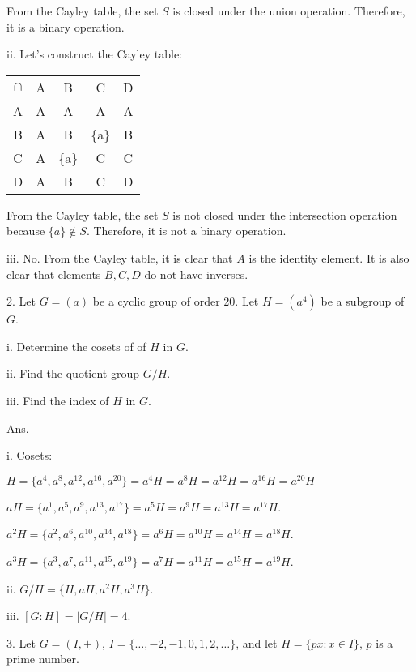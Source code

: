 \documentclass{article}
\begin{document}
From the Cayley table, the set $S$ is closed under the union operation. Therefore, it is a binary operation.
\newline

ii. Let's construct the Cayley table:

\begin{center}
  \begin{tabular}{c | c c c c}
    $\cap$ & A & B & C & D \\
    \cline{1-5}
    A & A & A & A & A \\
    B & A & B & \{a\} & B \\
    C & A & \{a\} & C & C \\
    D & A & B & C & D \\
  \end{tabular}
\end{center}

From the Cayley table, the set $S$ is not closed under the intersection operation because $\{a\} \notin S$. Therefore, it is not a binary operation.
\newline

iii. No. From the Cayley table, it is clear that $A$ is the identity element. It is also clear that elements $B, C, D$ do not have inverses.

\newpage

2. Let $G=(a)$ be a cyclic group of order 20. Let $H=(a^4)$ be a subgroup of $G$.

\qquad i. Determine the cosets of of $H$ in $G$.

\qquad ii. Find the quotient group $G/H$.

\qquad iii. Find the index of $H$ in $G$.

\noindent
\underline{Ans.}

i. 
Cosets:

$H = \{ a^4, a^8, a^{12}, a^{16}, a^{20} \} = a^4H = a^8H = a^{12}H = a^{16}H = a^{20}H$

$aH = \{a^1, a^5, a^9, a^{13}, a^{17} \} = a^5H= a^9H= a^{13}H= a^{17}H$.

$a^2H = \{a^2, a^6, a^{10}, a^{14}, a^{18} \}= a^6H= a^{10}H= a^{14}H= a^{18}H$.

$a^3H = \{a^3, a^7, a^{11}, a^{15}, a^{19} \}= a^7H= a^{11}H= a^{15}H= a^{19}H$.
\newline

ii. $G/H = \{H, aH, a^2H, a^3H \}$.

iii. $[G:H] = |G/H| = 4$.
\newpage

3. Let $G=(I,+)$, $I=\{\ldots, -2,-1,0,1,2,\ldots\}$, and let $H=\{px: x \in I\}$, $p$ is a prime number.
\end{document}
